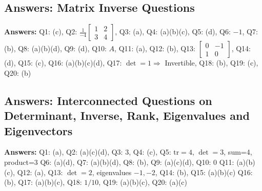\subsection*{Answers: Matrix Inverse Questions}
\noindent\textbf{Answers:}  
Q1: (c), Q2: $\frac{1}{-4} \begin{bmatrix} 1 & 2 \\ 3 & 4 \end{bmatrix}$, Q3: (a), Q4: (a)(b)(c), Q5: (d),  
Q6: $-1$, Q7: (b), Q8: (a)(b)(d), Q9: (d), Q10: $A$,  
Q11: (a), Q12: (b), Q13: $\begin{bmatrix} 0 & -1 \\ 1 & 0 \end{bmatrix}$, Q14: (d), Q15: (c),  
Q16: (a)(b)(c)(d), Q17: $\det = 1 \Rightarrow$ Invertible, Q18: (b), Q19: (c), Q20: (b)

\subsection*{Answers: Interconnected Questions on Determinant, Inverse, Rank, Eigenvalues and Eigenvectors}
\noindent\textbf{Answers:}  
Q1: (a), Q2: (a)(c)(d), Q3: 3, Q4: (c), Q5: $\text{tr}=4$, $\det=3$, sum=4, product=3  
Q6: (a)(d), Q7: (a)(b)(d), Q8: (b), Q9: (a)(c)(d), Q10: $0$  
Q11: (a)(b)(c), Q12: (a), Q13: $\det=2$, eigenvalues $-1, -2$, Q14: (b), Q15: (a)(b)(c)  
Q16: (b), Q17: (a)(b)(c), Q18: $1/10$, Q19: (a)(b)(c), Q20: (a)(c)
